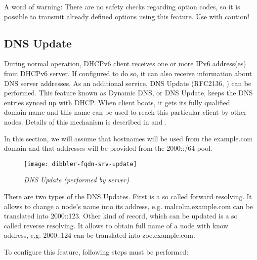 A word of warning: There are no safety checks regarding option codes,
so it is possible to transmit already defined options using this
feature. Use with caution!

\subsection{DNS Update}
\label{feature-dns-update}
During normal operation, DHCPv6 client receives one or more IPv6
address(es) from DHCPv6 server. If configured to do so, it can also
receive information about DNS server addresses. As an additional
service, DNS Update (RFC2136, \cite{rfc2136}) can be performed. This
feature known as Dynamic DNS, or DNS Update, keeps the DNS entries
synced up with DHCP. When client boots, it gets its fully qualified
domain name and this name can be used to reach this particular client
by other nodes. Details of this mechanism is described
in \cite{rfc2136} and \cite{rfc4704}.

\Note In this section, we will assume that hostnames will be used from
the example.com domain and that addresses will be provided from the
2000::/64 pool.

\begin{figure}[ht]
\begin{center}
\texttt{[image: dibbler-fqdn-srv-update]}
\caption{\emph{DNS Update (performed by server)}}
\end{center}
\end{figure}

There are two types of the DNS Updates. First is a so called forward
resolving. It allows to change a node's name into its address,
e.g. malcolm.example.com can be translated into 2000::123. Other kind
of record, which can be updated is a so called reverse resolving. It
allows to obtain full name of a node with know address, e.g. 2000::124
can be translated into zoe.example.com.

To configure this feature, following steps must be performed:

